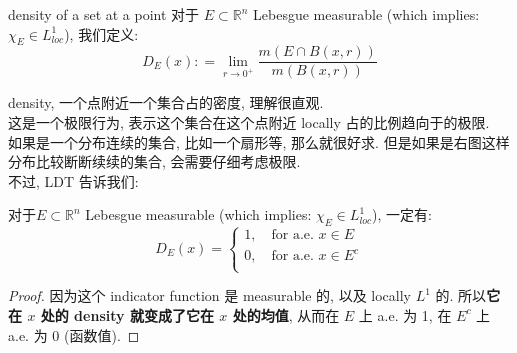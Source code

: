 \documentclass[lang=cn,11pt]{elegantbook}
\begin{document}
\begin{definition}{density of a set at a point}
    对于 $E\subset \mathbb{R}^n$ Lebesgue measurable (which implies: $\chi_E \in L^1_{loc}$), 我们定义: \[
    D_E(x) : = \lim_{r\to 0^+} \frac{m(E \cap B(x,r))}{m(B(x,r))} 
    \]
\end{definition}
\begin{remark}
    density, 一个点附近一个集合占的密度, 理解很直观.\\
    这是一个极限行为, 表示这个集合在这个点附近 locally 占的比例趋向于的极限.\\
如果是一个分布连续的集合, 比如一个扇形等, 那么就很好求. 但是如果是右图这样分布比较断断续续的集合, 会需要仔细考虑极限.\\
不过, LDT 告诉我们:
\end{remark}
\begin{corollary}
对于$E\subset \mathbb{R}^n$ Lebesgue measurable (which implies: $\chi_E \in L^1_{loc}$), 一定有: \[
    D_E(x) = \begin{cases}
        1,\quad \text{for a.e. } x\in E\\
        0, \quad \text{for a.e. } x\in E^c\\
    \end{cases}
    \]
\end{corollary}\begin{proof}
        因为这个 indicator function 是 measurable 的, 以及 locally $L^1$ 的. 所以\textbf{它在 $x$ 处的 density 就变成了它在 $x$ 处的均值}, 从而在 $E$ 上 a.e. 为 1, 在 $E^c$ 上 a.e. 为 0 (函数值).\end{proof}
\end{document}
